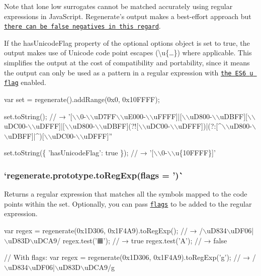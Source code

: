 Note that lone low surrogates cannot be matched accurately using regular expressions in Java\+Script. Regenerate’s output makes a best-\/effort approach but \href{https://github.com/mathiasbynens/regenerate/issues/28#issuecomment-72224808}{\tt there can be false negatives in this regard}.

If the {\ttfamily has\+Unicode\+Flag} property of the optional {\ttfamily options} object is set to {\ttfamily true}, the output makes use of Unicode code point escapes ({\ttfamily \textbackslash{}u\{…\}}) where applicable. This simplifies the output at the cost of compatibility and portability, since it means the output can only be used as a pattern in a regular expression with \href{https://mathiasbynens.be/notes/es6-unicode-regex}{\tt the E\+S6 {\ttfamily u} flag} enabled.


\begin{DoxyCode}
var set = regenerate().addRange(0x0, 0x10FFFF);

set.toString();
// →
       '[\(\backslash\)\(\backslash\)0-\(\backslash\)\(\backslash\)uD7FF\(\backslash\)\(\backslash\)uE000-\(\backslash\)\(\backslash\)uFFFF]|[\(\backslash\)\(\backslash\)uD800-\(\backslash\)\(\backslash\)uDBFF][\(\backslash\)\(\backslash\)uDC00-\(\backslash\)\(\backslash\)uDFFF]|[\(\backslash\)\(\backslash\)uD800-\(\backslash\)\(\backslash\)uDBFF](?![\(\backslash\)\(\backslash\)uDC00-\(\backslash\)\(\backslash\)uDFFF])|(?:[^\(\backslash\)\(\backslash\)uD800-\(\backslash\)\(\backslash\)uDBFF]|^)[\(\backslash\)\(\backslash\)uDC00-\(\backslash\)\(\backslash\)uDFFF]''

set.toString(\{ 'hasUnicodeFlag': true \});
// → '[\(\backslash\)\(\backslash\)0-\(\backslash\)\(\backslash\)u\{10FFFF\}]'
\end{DoxyCode}


\subsubsection*{`regenerate.\+prototype.\+to\+Reg\+Exp(flags = '\textquotesingle{})\`{}}

Returns a regular expression that matches all the symbols mapped to the code points within the set. Optionally, you can pass \href{https://developer.mozilla.org/en-US/docs/Web/JavaScript/Reference/Global_Objects/RegExp#Parameters}{\tt flags} to be added to the regular expression.


\begin{DoxyCode}
var regex = regenerate(0x1D306, 0x1F4A9).toRegExp();
// → /\(\backslash\)uD834\(\backslash\)uDF06|\(\backslash\)uD83D\(\backslash\)uDCA9/
regex.test('𝌆');
// → true
regex.test('A');
// → false

// With flags:
var regex = regenerate(0x1D306, 0x1F4A9).toRegExp('g');
// → /\(\backslash\)uD834\(\backslash\)uDF06|\(\backslash\)uD83D\(\backslash\)uDCA9/g
\end{DoxyCode}



